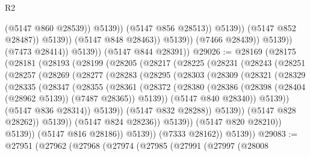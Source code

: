 \begin{lexlean}{R2}
\begin{coremodule}
                                          (@5147 @860 @28539))
                                        @5139))
                                    (@5147 @856 @28513))
                                  @5139))
                              (@5147 @852 @28487))
                            @5139))
                        (@5147 @848 @28463))
                      @5139))
                  (@7466 @28439))
                @5139))
            (@7473 @28414))
          @5139))
      (@5147 @844 @28391))
@29026 := @28169
    (@28175
      (@28181
        (@28193
          (@28199
            (@28205
              (@28217
                (@28225
                  (@28231
                    (@28243
                      (@28251
                        (@28257
                          (@28269
                            (@28277
                              (@28283
                                (@28295
                                  (@28303
                                    (@28309
                                      (@28321
                                        (@28329
                                          (@28335
                                            (@28347
                                              (@28355
                                                (@28361
                                                  (@28372
                                                    (@28380
                                                      (@28386
                                                        (@28398
                                                          (@28404 (@28962 @5139))
                                                          (@7487 @28365))
                                                        @5139))
                                                    (@5147 @840 @28340))
                                                  @5139))
                                              (@5147 @836 @28314))
                                            @5139))
                                        (@5147 @832 @28288))
                                      @5139))
                                  (@5147 @828 @28262))
                                @5139))
                            (@5147 @824 @28236))
                          @5139))
                      (@5147 @820 @28210))
                    @5139))
                (@5147 @816 @28186))
              @5139))
          (@7333 @28162))
        @5139))
@29083 := @27951
    (@27962
      (@27968
        (@27974
          (@27985
            (@27991
              (@27997
                (@28008

\end{coremodule}
\end{lexlean}

